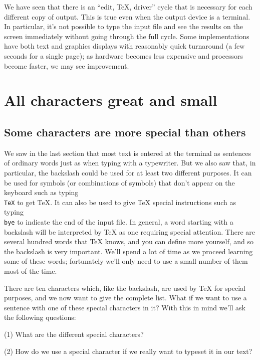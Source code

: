 We have seen that there is an ``edit, \TeX{}, driver'' cycle that 
is necessary for each different copy of output.  This is true 
even when the output device is a terminal.  In particular, it's 
not possible to type the input file and see the results on the 
screen immediately without going through the full cycle.  Some 
implementations have both text and graphics displays with 
reasonably quick turnaround (a few seconds for a single page); as 
hardware becomes less expensive and processors become faster, we 
may see improvement. 
 
 
 
 
 
 
\section{All characters great and small} 
 
\subsection{Some characters are more special than others} 
 
We saw in the last section that most text is entered at the 
terminal as sentences of ordinary words just as when typing with 
a typewriter. But we also saw that, in particular, the backslash 
could be used for at least two different purposes. It can be 
used for symbols (or combinations of symbols) that don't appear 
on the keyboard such as typing {\tt \\TeX} to get \TeX\null. It 
can also be used to give \TeX{} special instructions such as 
typing {\tt \\bye} to indicate the end of the input file. In 
general, a word starting with a backslash will be interpreted by 
\TeX{} as one requiring special attention. There are several 
hundred words that \TeX{} knows, and you can define more 
yourself, and so the backslash is very important. We'll spend a 
lot of time as we proceed learning some of these words; 
fortunately we'll only need to use a small number of them most of 
the time. 
 
There are ten characters which, like the backslash, are used 
by \TeX{} for special purposes, and we now want to give the 
complete list. 
What if we want to use a sentence with one of these 
special characters in it? With this in mind we'll ask the following 
questions: 
\item{(1)} What are the different special characters? 
\item{(2)} How do we use a special character if we really want to 
typeset it in our text? 
 
